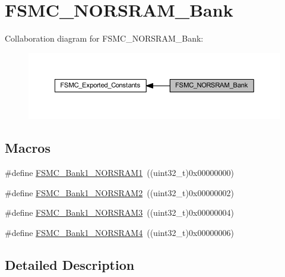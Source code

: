 \hypertarget{group___f_s_m_c___n_o_r_s_r_a_m___bank}{}\section{F\+S\+M\+C\+\_\+\+N\+O\+R\+S\+R\+A\+M\+\_\+\+Bank}
\label{group___f_s_m_c___n_o_r_s_r_a_m___bank}
Collaboration diagram for F\+S\+M\+C\+\_\+\+N\+O\+R\+S\+R\+A\+M\+\_\+\+Bank\+:
\nopagebreak
\begin{figure}[H]
\begin{center}
\leavevmode
\includegraphics[width=350pt]{group___f_s_m_c___n_o_r_s_r_a_m___bank}
\end{center}
\end{figure}
\subsection*{Macros}
\begin{DoxyCompactItemize}
\item 
\#define \hyperlink{group___f_s_m_c___n_o_r_s_r_a_m___bank_ga514a05828041fa1a13d464c9e4a0a4a9}{F\+S\+M\+C\+\_\+\+Bank1\+\_\+\+N\+O\+R\+S\+R\+A\+M1}~((uint32\+\_\+t)0x00000000)
\item 
\#define \hyperlink{group___f_s_m_c___n_o_r_s_r_a_m___bank_gaef52862c652370b9a658478d275dd956}{F\+S\+M\+C\+\_\+\+Bank1\+\_\+\+N\+O\+R\+S\+R\+A\+M2}~((uint32\+\_\+t)0x00000002)
\item 
\#define \hyperlink{group___f_s_m_c___n_o_r_s_r_a_m___bank_ga151b02506a318ac77382b52f3b5e16f4}{F\+S\+M\+C\+\_\+\+Bank1\+\_\+\+N\+O\+R\+S\+R\+A\+M3}~((uint32\+\_\+t)0x00000004)
\item 
\#define \hyperlink{group___f_s_m_c___n_o_r_s_r_a_m___bank_ga1083572834aa084d21e6698c280f8f74}{F\+S\+M\+C\+\_\+\+Bank1\+\_\+\+N\+O\+R\+S\+R\+A\+M4}~((uint32\+\_\+t)0x00000006)
\end{DoxyCompactItemize}


\subsection{Detailed Description}



